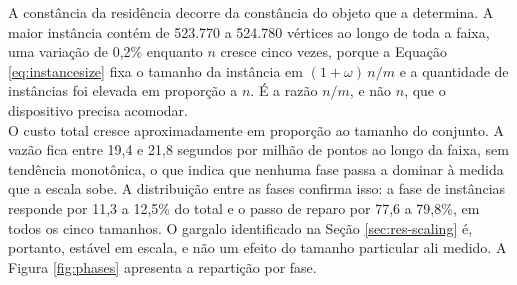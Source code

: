 A constância da residência decorre da constância do objeto que a determina. A maior instância contém de 523.770 a 524.780 vértices ao longo de toda a faixa, uma variação de 0,2\% enquanto $n$ cresce cinco vezes, porque a Equação \eqref{eq:instancesize} fixa o tamanho da instância em $(1+\omega)\,n/m$ e a quantidade de instâncias foi elevada em proporção a $n$. É a razão $n/m$, e não $n$, que o dispositivo precisa acomodar.\\

O custo total cresce aproximadamente em proporção ao tamanho do conjunto. A vazão fica entre 19,4 e 21,8 segundos por milhão de pontos ao longo da faixa, sem tendência monotônica, o que indica que nenhuma fase passa a dominar à medida que a escala sobe. A distribuição entre as fases confirma isso: a fase de instâncias responde por 11,3 a 12,5\% do total e o passo de reparo por 77,6 a 79,8\%, em todos os cinco tamanhos. O gargalo identificado na Seção \ref{sec:res-scaling} é, portanto, estável em escala, e não um efeito do tamanho particular ali medido. A Figura \ref{fig:phases} apresenta a repartição por fase.\\


